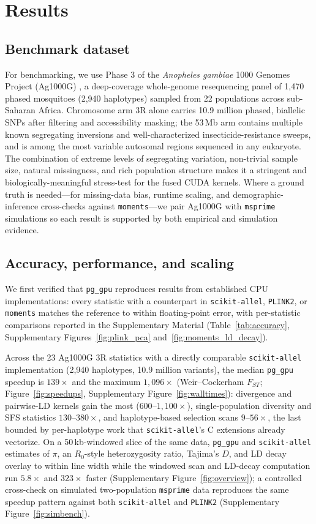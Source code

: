 \documentclass[12pt]{article}
\newcommand{\citep}{\parencite}
\newcommand{\pggpu}{\texttt{pg\_gpu}\xspace}
\newcommand{\scikitallel}{\texttt{scikit-allel}\xspace}
\newcommand{\plinktwo}{\texttt{PLINK2}\xspace}
\newcommand{\moments}{\texttt{moments}\xspace}
\newcommand{\msprime}{\texttt{msprime}\xspace}
\begin{document}
\section*{Results}

\subsection*{Benchmark dataset}

For benchmarking, we use Phase 3 of the \emph{Anopheles
gambiae} 1000 Genomes Project (Ag1000G) \citep{ag1000g2017}, a
deep-coverage whole-genome resequencing panel of 1{,}470 phased
mosquitoes (2{,}940 haplotypes) sampled from 22 populations across
sub-Saharan Africa. Chromosome arm 3R alone carries 10.9 million
phased, biallelic SNPs after filtering and accessibility masking; the
53\,Mb arm contains multiple known segregating inversions and
well-characterized insecticide-resistance sweeps, and is among the
most variable autosomal regions sequenced in any eukaryote. The
combination of extreme levels of segregating variation, non-trivial sample size, 
natural missingness, and rich population structure makes it a stringent and
biologically-meaningful stress-test for the fused CUDA kernels. Where a ground truth is
needed---for missing-data bias, runtime scaling, and
demographic-inference cross-checks against \moments---we pair
Ag1000G with \msprime \citep{baumdicker2022} simulations so each
result is supported by both empirical and simulation evidence.

\subsection*{Accuracy, performance, and scaling}

We first verified that \pggpu reproduces results from established CPU
implementations: every statistic with a counterpart in \scikitallel,
\plinktwo, or \moments matches the reference to within floating-point
error, with per-statistic comparisons reported in the Supplementary
Material (Table~\ref{tab:accuracy}, Supplementary
Figures~\ref{fig:plink_pca} and~\ref{fig:moments_ld_decay}).

Across the 23 Ag1000G 3R statistics with a directly comparable
\scikitallel implementation (2{,}940 haplotypes, 10.9 million
variants), the median \pggpu speedup is $139\times$ and the maximum
$1{,}096\times$ (Weir--Cockerham $F_{ST}$; Figure~\ref{fig:speedups},
Supplementary Figure~\ref{fig:walltimes}): divergence and pairwise-LD
kernels gain the most ($600$--$1{,}100\times$), single-population
diversity and SFS statistics $130$--$380\times$, and haplotype-based
selection scans $9$--$56\times$, the last bounded by per-haplotype
work that \scikitallel's C extensions already vectorize. On a
50\,kb-windowed slice of the same data, \pggpu and \scikitallel
estimates of $\pi$, an $R_0$-style heterozygosity ratio, Tajima's $D$,
and LD decay overlay to within line width while the windowed scan and
LD-decay computation run $5.8\times$ and $323\times$ faster
(Supplementary Figure~\ref{fig:overview}); a controlled cross-check on simulated
two-population \msprime data reproduces the same speedup pattern
against both \scikitallel and \plinktwo
(Supplementary Figure~\ref{fig:simbench}).
\end{document}
